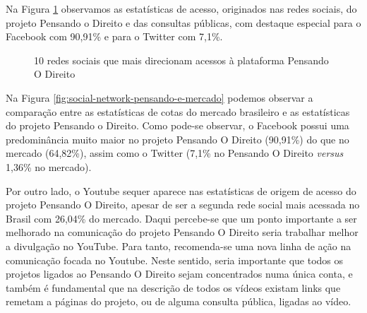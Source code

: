 Na Figura \ref{fig:social-network-pensando} observamos as estatísticas de acesso, originados nas redes sociais, do projeto Pensando o Direito e das consultas públicas, com destaque especial para o Facebook com 90,91\% e para o Twitter com 7,1\%.
\begin{figure}[htb]%
	\begin{center}
	\end{center}%
	\caption{10 redes sociais que mais direcionam acessos à plataforma Pensando O Direito\label{fig:social-network-pensando}}%
\end{figure}%

Na Figura \ref{fig:social-network-pensando-e-mercado} podemos observar a comparação entre as estatísticas de cotas do mercado brasileiro e as estatísticas do projeto Pensando o Direito. Como pode-se observar, o Facebook possui uma predominância muito maior no projeto Pensando O Direito (90,91\%) do que no mercado (64,82\%), assim como o Twitter (7,1\% no Pensando O Direito \textit{versus} 1,36\% no mercado).

Por outro lado, o Youtube sequer aparece nas estatísticas de origem de acesso do projeto Pensando O Direito, apesar de ser a segunda rede social mais acessada no Brasil com 26,04\% do mercado. Daqui percebe-se que um ponto importante a ser melhorado na comunicação do projeto Pensando O Direito seria trabalhar melhor a divulgação no YouTube. Para tanto, recomenda-se uma nova linha de ação na comunicação focada no Youtube. Neste sentido, seria importante que todos os projetos ligados ao Pensando O Direito sejam concentrados numa única conta, e também é fundamental que na descrição de todos os vídeos existam links que remetam a páginas do projeto, ou de alguma consulta pública, ligadas ao vídeo.

